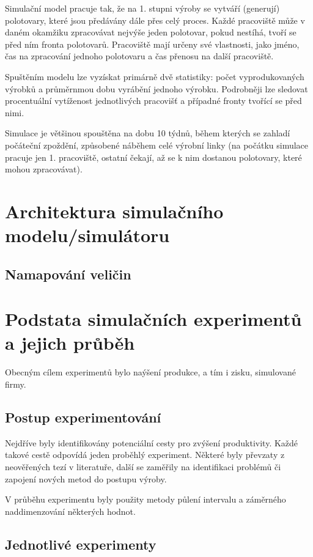 \documentclass[11pt, a4paper]{article}
\begin{document}
Simulační model pracuje tak, že na 1. stupni výroby se vytváří (generují) polotovary, které jsou předávány dále přes celý proces. Každé pracoviště může v daném okamžiku zpracovávat nejvýše jeden polotovar, pokud nestíhá, tvoří se před ním fronta polotovarů. Pracoviště mají určeny své vlastnosti, jako jméno, čas na zpracování jednoho polotovaru a čas přenosu na další pracoviště.

Spuštěním modelu lze vyzískat primárně dvě statistiky: počet vyprodukovaných výrobků a průměrnmou dobu vyrábění jednoho výrobku. Podrobněji lze sledovat procentuální vytíženost jednotlivých pracovišť a případné fronty tvořící se před nimi.

Simulace je většinou spouštěna na dobu 10 týdnů, během kterých se zahladí počáteční zpoždění, způsobené náběhem celé výrobní linky (na počátku simulace pracuje jen 1. pracoviště, ostatní čekají, až se k nim dostanou polotovary, které mohou zpracovávat).


\section{Architektura simulačního modelu/simulátoru}


\subsection{Namapování veličin}


\section{Podstata simulačních experimentů a jejich průběh}
Obecným cílem experimentů bylo naýšení produkce, a tím i zisku, simulované firmy.

\subsection{Postup experimentování}
Nejdříve byly identifikovány potenciální cesty pro zvýšení produktivity. Každé takové cestě odpovídá jeden proběhlý experiment. Některé byly převzaty z neověřených tezí v literatuře, další se zaměřily na identifikaci problémů či zapojení nových metod do postupu výroby.

V průběhu experimentu byly použity metody půlení intervalu a záměrného naddimenzování některých hodnot.

\subsection{Jednotlivé experimenty}
\end{document}
